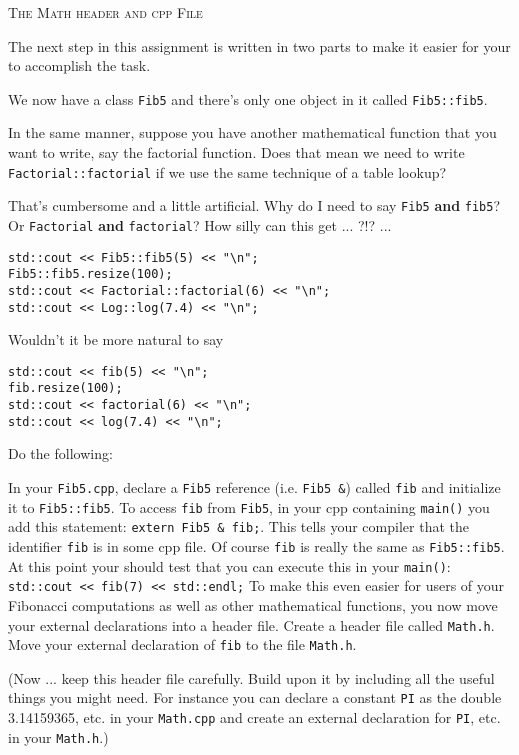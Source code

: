 \textsc{The Math header and cpp File}

The next step in this assignment is written in two parts to make it easier for your to accomplish the
task.

We now have a class \texttt{Fib5} and there's only one object in it called \texttt{Fib5::fib5}.

In the same manner, suppose you have another mathematical function that you want to write, say the
factorial function. Does that mean we need to write \texttt{Factorial::factorial} if we use the same
technique of a table lookup?

That's cumbersome and a little artificial. Why do I need to say \texttt{Fib5} \textbf{and} \verb!fib5!? Or \texttt{Factorial} \textbf{and}
\verb!factorial!? How silly can this get ... ?!? ...

\begin{Verbatim}[frame=single]
std::cout << Fib5::fib5(5) << "\n";
Fib5::fib5.resize(100);
std::cout << Factorial::factorial(6) << "\n";
std::cout << Log::log(7.4) << "\n";
\end{Verbatim}

Wouldn't it be more natural to say

\begin{Verbatim}[frame=single]
std::cout << fib(5) << "\n";
fib.resize(100);
std::cout << factorial(6) << "\n";
std::cout << log(7.4) << "\n";
\end{Verbatim}

Do the following:
\begin{tightlist}
  \li In your \texttt{Fib5.cpp}, declare a \texttt{Fib5} reference (i.e. \texttt{Fib5 \&}) called \verb!fib! and initialize it to
  \texttt{Fib5::fib5}.
  \li To access \verb!fib! from \texttt{Fib5}, in your cpp containing
  \texttt{main()} you add this statement:
  \texttt{extern Fib5 \& fib;}.
  This tells your compiler that the identifier \verb!fib! is in some cpp file.
  Of course \verb!fib! is really the
  same as \texttt{Fib5::fib5}. At this point your should test that you
  can execute this in your
  \texttt{main()}:
      \verb!std::cout << fib(7) << std::endl;!
      \li To make this even easier for users of your Fibonacci computations as
      well as other
      mathematical functions, you now move your external declarations into
      a header file. Create a
  header file called \texttt{Math.h}. Move your external declaration of \verb!fib! to the file \texttt{Math.h}.
\end{tightlist}

(Now ... keep this header file carefully. Build upon it by including all the useful things you might need.
For instance you can declare a constant \verb!PI! as the double 3.14159365, etc. in your \texttt{Math.cpp} and
create an external declaration for \verb!PI!, etc. in your \texttt{Math.h}.)

